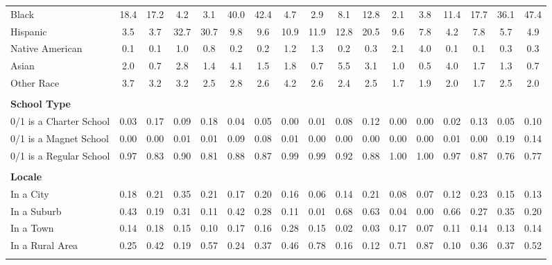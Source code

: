 \begin{tabular*}{\linewidth}{@{\extracolsep{\fill} } lcccccccccccccccc}
\hspace{0.2cm}Black&18.4&17.2&4.2&3.1&40.0&42.4&4.7&2.9&8.1&12.8&2.1&3.8&11.4&17.7&36.1&47.4\\%
\hspace{0.2cm}Hispanic&3.5&3.7&32.7&30.7&9.8&9.6&10.9&11.9&12.8&20.5&9.6&7.8&4.2&7.8&5.7&4.9\\%
\hspace{0.2cm}Native American&0.1&0.1&1.0&0.8&0.2&0.2&1.2&1.3&0.2&0.3&2.1&4.0&0.1&0.1&0.3&0.3\\%
\hspace{0.2cm}Asian&2.0&0.7&2.8&1.4&4.1&1.5&1.8&0.7&5.5&3.1&1.0&0.5&4.0&1.7&1.3&0.7\\%
\hspace{0.2cm}Other Race&3.7&3.2&3.2&2.5&2.8&2.6&4.2&2.6&2.4&2.5&1.7&1.9&2.0&1.7&2.5&2.0\\%
&&&&&&&&&&&&&&&&\\%
\multicolumn{17}{l}{\bfseries School Type}\\%
\hspace{0.2cm}0/1 is a Charter School&0.03&0.17&0.09&0.18&0.04&0.05&0.00&0.01&0.08&0.12&0.00&0.00&0.02&0.13&0.05&0.10\\%
\hspace{0.2cm}0/1 is a Magnet School&0.00&0.00&0.01&0.01&0.09&0.08&0.01&0.00&0.00&0.00&0.00&0.00&0.01&0.00&0.19&0.14\\%
\hspace{0.2cm}0/1 is a Regular School&0.97&0.83&0.90&0.81&0.88&0.87&0.99&0.99&0.92&0.88&1.00&1.00&0.97&0.87&0.76&0.77\\%
&&&&&&&&&&&&&&&&\\%
\multicolumn{17}{l}{\bfseries Locale}\\%
\hspace{0.2cm}In a City&0.18&0.21&0.35&0.21&0.17&0.20&0.16&0.06&0.14&0.21&0.08&0.07&0.12&0.23&0.15&0.13\\%
\hspace{0.2cm}In a Suburb&0.43&0.19&0.31&0.11&0.42&0.28&0.11&0.01&0.68&0.63&0.04&0.00&0.66&0.27&0.35&0.20\\%
\hspace{0.2cm}In a Town&0.14&0.18&0.15&0.10&0.17&0.16&0.28&0.15&0.02&0.03&0.17&0.07&0.11&0.14&0.13&0.14\\%
\hspace{0.2cm}In a Rural Area&0.25&0.42&0.19&0.57&0.24&0.37&0.46&0.78&0.16&0.12&0.71&0.87&0.10&0.36&0.37&0.52\\%
&&&&&&&&&&&&&&&&\\%
\hline%
\end{tabular*}